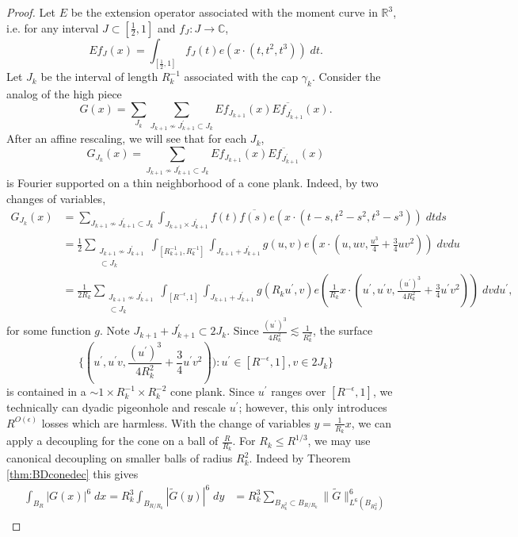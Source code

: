 \documentclass[12pt]{amsart}
\providecommand{\ol}{\overline}
\providecommand{\C}{\mathbb C}
\providecommand{\R}{\mathbb R}
\begin{document}
\begin{proof}
    Let $E$ be the extension operator associated with the moment curve in $\R^3$, i.e. for any interval $J\subset [\frac{1}{2}, 1]$ and $f_J:J\to \C$, $$Ef_J(x)= \int_{[\frac{1}{2}, 1]}f_J(t) e(x\cdot (t, t^2, t^3))\;dt.$$ Let $J_k$ be the interval of length $R_k^{-1}$ associated with the cap $\gamma_k$. Consider the analog of the high piece $$G(x)=\sum_{J_k}\sum_{J_{k+1}\not\sim J_{k+1}^\prime\subset J_k} Ef_{J_{k+1}}(x)\ol{Ef_{J_{k+1}^\prime}}(x).$$ After an affine rescaling, we will see that for each $J_k$, $$G_{J_k}(x)=\sum_{J_{k+1}\not\sim J_{k+1}^\prime\subset J_k} Ef_{J_{k+1}}(x)\ol{Ef_{J_{k+1}^\prime}}(x)$$ is Fourier supported on a thin neighborhood of a cone plank. Indeed, by two changes of variables, \begin{align*}
        G_{J_k}(x) & = \sum_{J_{k+1}\not\sim J_{k+1}^\prime\subset J_k} \int_{J_{k+1}\times J_{k+1}^\prime}f(t)\ol{f(s)}e(x\cdot (t-s, t^2-s^2, t^3-s^3))\; dtds\\
        &= \frac{1}{2}\sum_{\substack{J_{k+1}\not\sim J_{k+1}^\prime\\\subset J_k}} \int_{[R_{k+1}^{-1}, R_k^{-1}]} \int_{J_{k+1}+J_{k+1}^\prime} g(u,v)e(x\cdot(u, uv, \frac{u^3}{4}+\frac{3}{4}uv^2))\; dvdu\\
        &= \frac{1}{2R_k}\sum_{\substack{J_{k+1}\not\sim J_{k+1}^\prime\\\subset J_k}}\int_{[R^{-\epsilon}, 1]} \int_{J_{k+1}+J_{k+1}^\prime}g(R_ku^\prime, v)e(\frac{1}{R_k}x\cdot(u^\prime, u^\prime v, \frac{(u^\prime)^3}{4R_k^2}+\frac{3}{4}u^\prime v^2))\; dvdu^\prime,
    \end{align*} for some function $g$. Note $J_{k+1}+J_{k+1}^\prime\subset 2J_k$. Since $\frac{(u^\prime)^3}{4R_k^2}\lesssim \frac{1}{R_k^2}$, the surface $$\{(u^\prime, u^\prime v, \frac{(u^\prime)^3}{4R_k^2}+\frac{3}{4}u^\prime v^2)): u^\prime \in [R^{-\epsilon}, 1], v\in 2J_k\}$$ is contained in a $\sim 1\times R_k^{-1}\times R_k^{-2}$ cone plank. Since $u^\prime$ ranges over $[R^{-\epsilon}, 1]$, we technically can dyadic pigeonhole and rescale $u^\prime$; however, this only introduces $R^{O(\epsilon)}$ losses which are harmless. With the change of variables $y=\frac{1}{R_k}x$, we can apply a decoupling for the cone on a ball of $\frac{R}{R_k}$. For $R_k\le R^{1/3}$, we may use canonical decoupling on smaller balls of radius $R_k^2$. Indeed by Theorem \ref{thm:BDconedec} this gives\begin{align*}
       \int_{B_R}|G(x)|^6\; dx=R_k^3\int_{B_{R/R_k}}|\tilde{G}(y)|^6\; dy
       &=R_k^3\sum_{B_{R_k^2}\subset B_{R/R_k}}\|\tilde{G}\|_{L^6(B_{R_k^2})}^6\\

\end{align*}
\end{proof}
\end{document}
